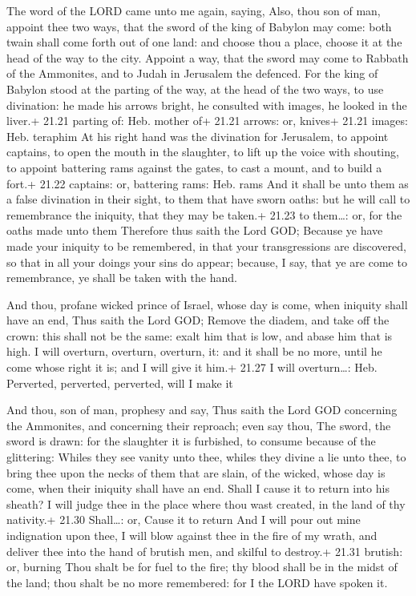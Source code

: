  The word of the LORD came unto me again, saying,
 Also, thou son of man, appoint thee two ways, that the
sword of the king of Babylon may come: both twain shall come forth out
of one land: and choose thou a place, choose it at the head of the way
to the city.  Appoint a way, that the sword may come to
Rabbath of the Ammonites, and to Judah in Jerusalem the defenced.
 For the king of Babylon stood at the parting of the way,
at the head of the two ways, to use divination: he made his arrows
bright, he consulted with images, he looked in the liver.+ 21.21 parting
of: Heb. mother of+ 21.21 arrows: or, knives+ 21.21 images: Heb.
teraphim  At his right hand was the divination for
Jerusalem, to appoint captains, to open the mouth in the slaughter, to
lift up the voice with shouting, to appoint battering rams against the
gates, to cast a mount, and to build a fort.+ 21.22 captains: or,
battering rams: Heb. rams  And it shall be unto them as a
false divination in their sight, to them that have sworn oaths: but he
will call to remembrance the iniquity, that they may be taken.+ 21.23 to
them\ldots: or, for the oaths made unto them  Therefore
thus saith the Lord GOD; Because ye have made your iniquity to be
remembered, in that your transgressions are discovered, so that in all
your doings your sins do appear; because, I say, that ye are come to
remembrance, ye shall be taken with the hand.

 And thou, profane wicked prince of Israel, whose day is
come, when iniquity shall have an end,  Thus saith the Lord
GOD; Remove the diadem, and take off the crown: this shall not be the
same: exalt him that is low, and abase him that is high.  I
will overturn, overturn, overturn, it: and it shall be no more, until he
come whose right it is; and I will give it him.+ 21.27 I will
overturn\ldots: Heb. Perverted, perverted, perverted, will I make it

 And thou, son of man, prophesy and say, Thus saith the
Lord GOD concerning the Ammonites, and concerning their reproach; even
say thou, The sword, the sword is drawn: for the slaughter it is
furbished, to consume because of the glittering:  Whiles
they see vanity unto thee, whiles they divine a lie unto thee, to bring
thee upon the necks of them that are slain, of the wicked, whose day is
come, when their iniquity shall have an end.  Shall I cause
it to return into his sheath? I will judge thee in the place where thou
wast created, in the land of thy nativity.+ 21.30 Shall\ldots: or, Cause
it to return  And I will pour out mine indignation upon
thee, I will blow against thee in the fire of my wrath, and deliver thee
into the hand of brutish men, and skilful to destroy.+ 21.31 brutish:
or, burning  Thou shalt be for fuel to the fire; thy blood
shall be in the midst of the land; thou shalt be no more remembered: for
I the LORD have spoken it.

